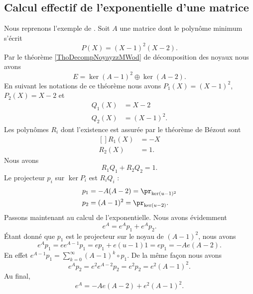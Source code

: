 \subsection{Calcul effectif de l'exponentielle d'une matrice}
\label{SUBSECooGAHVooBRUFub}

Nous reprenons l'exemple de \cite{MneimneReduct}. Soit \( A\) une matrice dont le polynôme minimum s'écrit
\begin{equation}
    P(X)=(X-1)^2(X-2).
\end{equation}
Par le théorème \ref{ThoDecompNoyayzzMWod} de décomposition des noyaux nous avons
\begin{equation}
    E=\ker(A-1)^2\oplus\ker(A-2).
\end{equation}
En suivant les notations de ce théorème nous avons \( P_1(X)=(X-1)^2\), \( P_2(X)=X-2\) et
\begin{subequations}
    \begin{align}
        Q_1(X)&=X-2\\
        Q_2(X)&=(X-1)^2.
    \end{align}
\end{subequations}
Les polynômes \( R_i\) dont l'existence est assurée par le théorème de Bézout sont
\begin{equation}
    \begin{aligned}[]
        R_1(X)&=-X\\
        R_2(X)&=1.
    \end{aligned}
\end{equation}
Nous avons
\begin{equation}
    R_1Q_1+R_2Q_2=1.
\end{equation}
Le projecteur \( p_i\) sur \( \ker P_i\) est \( R_iQ_i\) :
\begin{equation}
    \begin{aligned}[]
        p_1&=-A(A-2)=\pr_{\ker(u-1)^2}\\
        p_2&=(A-1)^2=\pr_{\ker(u-2)}.
    \end{aligned}
\end{equation}
Passons maintenant au calcul de l'exponentielle. Nous avons évidemment
\begin{equation}
    e^A=e^Ap_1+e^Ap_2.
\end{equation}
Étant donné que \( p_1\) est le projecteur sur le noyau de \( (A-1)^2\), nous avons
\begin{equation}
    e^Ap_1=ee^{A-1}p_1=ep_1+e(u-1)1=ep_1=-Ae(A-2).
\end{equation}
En effet \( e^{A-1}p_1=\sum_{k=0}^{\infty}(A-1)^k\circ p_1\). De la même façon nous avons
\begin{equation}
    e^Ap_2=e^2e^{A-2}p_2=e^2p_2=e^2(A-1)^2.
\end{equation}
Au final,
\begin{equation}
    e^A=-Ae(A-2)+e^2(A-1)^2.
\end{equation}


